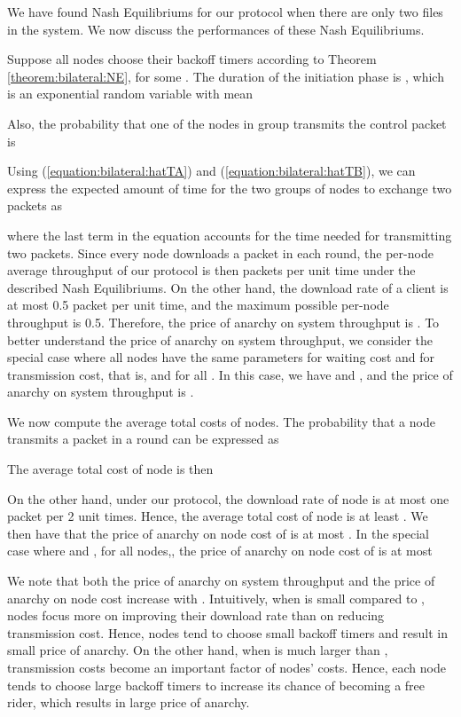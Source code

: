 \documentclass[11pt, conference]{IEEEtran}
\begin{document}
We have found Nash Equilibriums for our protocol when there are only two files in the system. We now discuss the performances of these Nash Equilibriums.

Suppose all nodes choose their backoff timers according to Theorem \ref{theorem:bilateral:NE}, for some . The duration of the initiation phase is , which is an exponential random variable with mean

Also, the probability that one of the nodes in group  transmits the control packet is


Using (\ref{equation:bilateral:hatTA}) and (\ref{equation:bilateral:hatTB}), we can express the expected amount of time for the two groups of nodes to exchange two packets as

where the last term in the equation accounts for the time needed for transmitting two packets. Since every node downloads a packet in each round, the per-node average throughput of our protocol is then  packets per unit time under the described Nash Equilibriums. On the other hand, the download rate of a client is at most 0.5 packet per unit time, and the maximum possible per-node throughput is 0.5. Therefore, the price of anarchy on system throughput is . To better understand the price of anarchy on system throughput, we consider the special case where all nodes have the same parameters for waiting cost and for transmission cost, that is,  and  for all . In this case, we have  and , and the price of anarchy on system throughput is .

We now compute the average total costs of nodes. The probability that a node  transmits a packet in a round can be expressed as

The average total cost of node  is then


On the other hand, under our protocol, the download rate of node  is at most one packet per 2 unit times. Hence, the average total cost of node  is at least . We then have that the price of anarchy on node cost of  is at most . In the special case where  and , for all nodes,, the price of anarchy on node cost of  is at most 

We note that both the price of anarchy on system throughput and the price of anarchy on node cost increase with . Intuitively, when  is small compared to , nodes focus more on improving their download rate than on reducing transmission cost. Hence, nodes tend to choose small backoff timers and result in small price of anarchy. On the other hand, when  is much larger than , transmission costs become an important factor of nodes' costs. Hence, each node tends to choose large backoff timers to increase its chance of becoming a free rider, which results in large price of anarchy.
\end{document}
